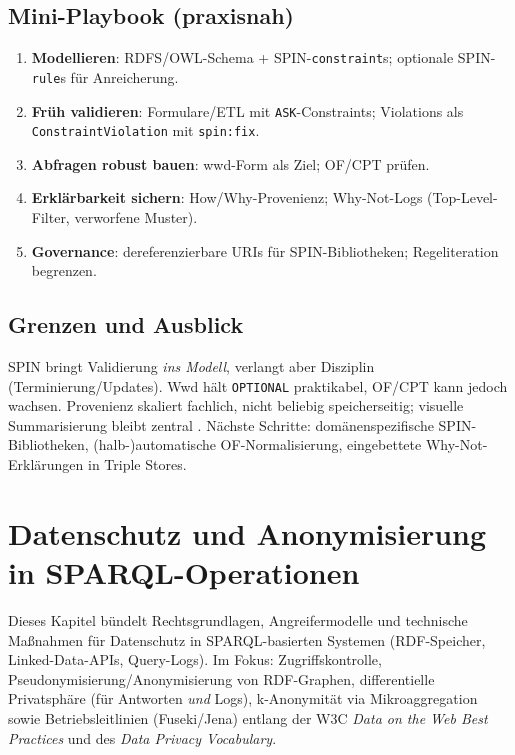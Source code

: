 \subsection{Mini-Playbook (praxisnah)}
\begin{enumerate}
  \item \textbf{Modellieren}: RDFS/OWL-Schema + SPIN-\texttt{constraint}s; optionale SPIN-\texttt{rule}s für Anreicherung.
  \item \textbf{Früh validieren}: Formulare/ETL mit \texttt{ASK}-Constraints; Violations als \texttt{ConstraintViolation} mit \texttt{spin:fix}.
  \item \textbf{Abfragen robust bauen}: wwd-Form als Ziel; OF/CPT prüfen.
  \item \textbf{Erklärbarkeit sichern}: How/Why-Provenienz; Why-Not-Logs (Top-Level-Filter, verworfene Muster).
  \item \textbf{Governance}: dereferenzierbare URIs für SPIN-Bibliotheken; Regeliteration begrenzen.
\end{enumerate}

\subsection{Grenzen und Ausblick}
SPIN bringt Validierung \emph{ins Modell}, verlangt aber Disziplin (Terminierung/Updates). Wwd hält \texttt{OPTIONAL} praktikabel, OF/CPT kann jedoch wachsen. Provenienz skaliert fachlich, nicht beliebig speicherseitig; visuelle Summarisierung bleibt zentral \cite{herschel-survey}. Nächste Schritte: domänenspezifische SPIN-Bibliotheken, (halb-)automatische OF-Normalisierung, eingebettete Why-Not-Erklärungen in Triple Stores.








\section{Datenschutz und Anonymisierung in SPARQL-Operationen}
\label{sec:privacy}

Dieses Kapitel bündelt Rechtsgrundlagen, Angreifermodelle und technische Maßnahmen für Datenschutz in SPARQL-basierten Systemen (RDF-Speicher, Linked-Data-APIs, Query-Logs). Im Fokus: Zugriffskontrolle, Pseudonymisierung/Anonymisierung von RDF-Graphen, differentielle Privatsphäre (für Antworten \emph{und} Logs), k-Anonymität via Mikroaggregation sowie Betriebsleitlinien (Fuseki/Jena) entlang der W3C \emph{Data on the Web Best Practices} und des \emph{Data Privacy Vocabulary}.

